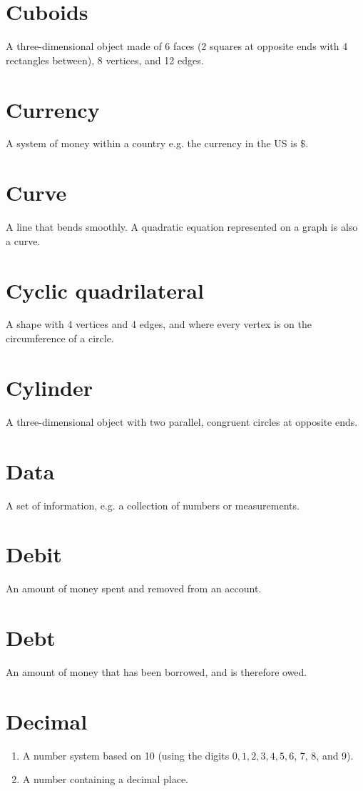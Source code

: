 \documentclass[10pt]{article}
\begin{document}
\section*{Cuboids}
A three-dimensional object made of 6 faces (2 squares at opposite ends with 4 rectangles between), 8 vertices, and 12 edges.

\section*{Currency}
A system of money within a country e.g. the currency in the US is $\$$.

\section*{Curve}
A line that bends smoothly. A quadratic equation represented on a graph is also a curve.

\section*{Cyclic quadrilateral}
A shape with 4 vertices and 4 edges, and where every vertex is on the circumference of a circle.

\section*{Cylinder}
A three-dimensional object with two parallel, congruent circles at opposite ends.

\section*{Data}
A set of information, e.g. a collection of numbers or measurements.

\section*{Debit}
An amount of money spent and removed from an account.

\section*{Debt}
An amount of money that has been borrowed, and is therefore owed.

\section*{Decimal}
\begin{enumerate}
  \item A number system based on 10 (using the digits $0,1,2,3,4,5,6$, 7, 8, and 9).
  \item A number containing a decimal place.
\end{enumerate}
\end{document}

